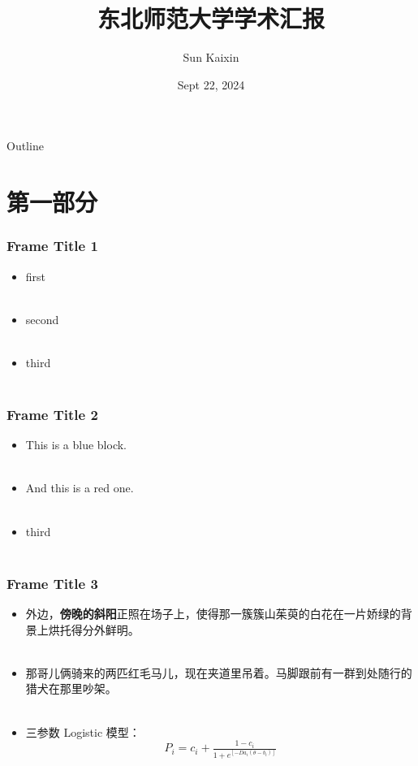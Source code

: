 \documentclass[10pt,aspectratio=43]{beamer} %
\title{东北师范大学学术汇报}
\author{Sun Kaixin}
\institute{Northeast Normal University}
\date{Sept 22, 2024}
\begin{document}
	\begin{frame}
		\maketitle
	\end{frame}
	\begin{frame}{Outline} %
		\tableofcontents
	\end{frame}
	\section{第一部分}
	\begin{frame}
		\frametitle{Frame Title 1}
		\begin{itemize} 
			\item first \\~\\ %
			\item second \\~\\
			\item third \\~\\
		\end{itemize}
	\end{frame}
	\begin{frame}
		\frametitle{Frame Title 2}
		\begin{itemize} 
			\item {\color{blue} This is a blue block.} \\~\\
			\item {\color{red} And this is a red one.} \\~\\
			\item third \\~\\
		\end{itemize}
	\end{frame}
	\begin{frame}
		\frametitle{Frame Title 3}
		\begin{itemize} 
			\item 外边，\textbf {傍晚的斜阳}正照在场子上，使得那一簇簇山茱萸的白花在一片娇绿的背景上烘托得分外鲜明。\\~\\
			\item 那哥儿俩骑来的两匹红毛马儿，现在夹道里吊着。马脚跟前有一群到处随行的猎犬在那里吵架。\\~\\
			\item 三参数 Logistic 模型：
			{\LARGE $$
				P_{i}=c_{i} +\tfrac{1-c_{i}}{1+e^{[-Da_{i}(\theta -b_{i})]}}
				$$} %
		\end{itemize}
	\end{frame}
\end{document}
